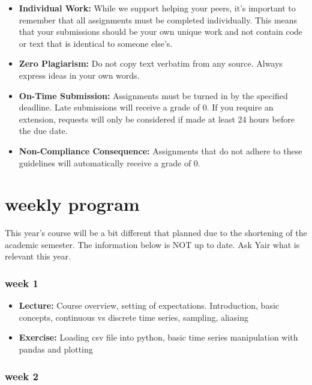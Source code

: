 \documentclass[
  letterpaper,
  DIV=11,
  numbers=noendperiod,
  oneside]{scrreprt}
\providecommand{\tightlist}{%
  \setlength{\itemsep}{0pt}\setlength{\parskip}{0pt}}\usepackage{longtable,booktabs,array}
\begin{document}
\begin{itemize}
\item
  \textbf{Individual Work:} While we support helping your peers, it's
  important to remember that all assignments must be completed
  individually. This means that your submissions should be your own
  unique work and not contain code or text that is identical to someone
  else's.
\item
  \textbf{Zero Plagiarism:} Do not copy text verbatim from any source.
  Always express ideas in your own words.
\item
  \textbf{On-Time Submission:} Assignments must be turned in by the
  specified deadline. Late submissions will receive a grade of 0. If you
  require an extension, requests will only be considered if made at
  least 24 hours before the due date.
\item
  \textbf{Non-Compliance Consequence:} Assignments that do not adhere to
  these guidelines will automatically receive a grade of 0.
\end{itemize}

\hypertarget{weekly-program}{%
\section*{weekly program}\label{weekly-program}}


This year's course will be a bit different that planned due to the
shortening of the academic semester. The information below is NOT up to
date. Ask Yair what is relevant this year.

\hypertarget{week-1}{%
\subsubsection*{week 1}\label{week-1}}

\begin{itemize}
\tightlist
\item
  \textbf{Lecture:} Course overview, setting of expectations.
  Introduction, basic concepts, continuous vs discrete time series,
  sampling, aliasing
\item
  \textbf{Exercise:} Loading csv file into python, basic time series
  manipulation with pandas and plotting
\end{itemize}

\hypertarget{week-2}{%
\subsubsection*{week 2}\label{week-2}}
\end{document}
